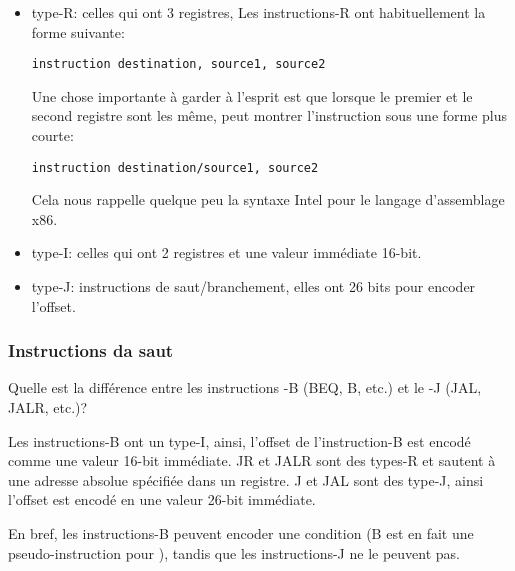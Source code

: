 \begin{itemize}

\item type-R: celles qui ont 3 registres, Les instructions-R ont habituellement la
forme suivante:

\begin{lstlisting}
instruction destination, source1, source2
\end{lstlisting}

Une chose importante à garder à l'esprit est que lorsque le premier et le second
registre sont les même, \IDA peut montrer l'instruction sous une forme plus courte:

\begin{lstlisting}
instruction destination/source1, source2
\end{lstlisting}

Cela nous rappelle quelque peu la syntaxe Intel pour le langage d'assemblage x86.

\item type-I: celles qui ont 2 registres et une valeur immédiate 16-bit.

\item type-J: instructions de saut/branchement, elles ont 26 bits pour encoder l'offset.

\end{itemize}

\subsubsection{Instructions da saut}

Quelle est la différence entre les instructions -B (BEQ, B, etc.) et le -J (JAL, JALR, etc.)?

Les instructions-B ont un type-I, ainsi, l'offset de l'instruction-B est encodé
comme une valeur 16-bit immédiate.
JR et JALR sont des types-R et sautent à une adresse absolue spécifiée dans un registre.
J et JAL sont des type-J, ainsi l'offset est encodé en une valeur 26-bit immédiate.

En bref, les instructions-B peuvent encoder une condition (B est en fait une pseudo-instruction
pour ), tandis que les instructions-J ne le peuvent pas.
